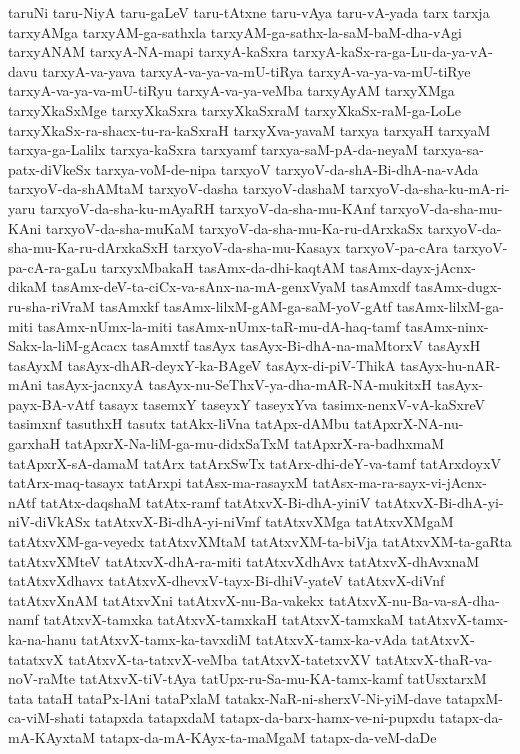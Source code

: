{taruNi
taru-NiyA
taru-gaLeV
taru-tAtxne
taru-vAya
taru-vA-yada
tarx
tarxja
tarxyAMga
tarxyAM-ga-sathxla
tarxyAM-ga-sathx-la-saM-baM-dha-vAgi
tarxyANAM
tarxyA-NA-mapi
tarxyA-kaSxra
tarxyA-kaSx-ra-ga-Lu-da-ya-vA-davu
tarxyA-va-yava
tarxyA-va-ya-va-mU-tiRya
tarxyA-va-ya-va-mU-tiRye
tarxyA-va-ya-va-mU-tiRyu
tarxyA-va-ya-veMba
tarxyAyAM
tarxyXMga
tarxyXkaSxMge
tarxyXkaSxra
tarxyXkaSxraM
tarxyXkaSx-raM-ga-LoLe
tarxyXkaSx-ra-shacx-tu-ra-kaSxraH
tarxyXva-yavaM
tarxya
tarxyaH
tarxyaM
tarxya-ga-Lalilx
tarxya-kaSxra
tarxyamf
tarxya-saM-pA-da-neyaM
tarxya-sa-patx-diVkeSx
tarxya-voM-de-nipa
tarxyoV
tarxyoV-da-shA-Bi-dhA-na-vAda
tarxyoV-da-shAMtaM
tarxyoV-dasha
tarxyoV-dashaM
tarxyoV-da-sha-ku-mA-ri-yaru
tarxyoV-da-sha-ku-mAyaRH
tarxyoV-da-sha-mu-KAnf
tarxyoV-da-sha-mu-KAni
tarxyoV-da-sha-muKaM
tarxyoV-da-sha-mu-Ka-ru-dArxkaSx
tarxyoV-da-sha-mu-Ka-ru-dArxkaSxH
tarxyoV-da-sha-mu-Kasayx
tarxyoV-pa-cAra
tarxyoV-pa-cA-ra-gaLu
tarxyxMbakaH
tasAmx-da-dhi-kaqtAM
tasAmx-dayx-jAcnx-dikaM
tasAmx-deV-ta-ciCx-va-sAnx-na-mA-genxVyaM
tasAmxdf
tasAmx-dugx-ru-sha-riVraM
tasAmxkf
tasAmx-lilxM-gAM-ga-saM-yoV-gAtf
tasAmx-lilxM-ga-miti
tasAmx-nUmx-la-miti
tasAmx-nUmx-taR-mu-dA-haq-tamf
tasAmx-ninx-Sakx-la-liM-gAcacx
tasAmxtf
tasAyx
tasAyx-Bi-dhA-na-maMtorxV
tasAyxH
tasAyxM
tasAyx-dhAR-deyxY-ka-BAgeV
tasAyx-di-piV-ThikA
tasAyx-hu-nAR-mAni
tasAyx-jacnxyA
tasAyx-nu-SeThxV-ya-dha-mAR-NA-mukitxH
tasAyx-payx-BA-vAtf
tasayx
tasemxY
taseyxY
taseyxYva
tasimx-nenxV-vA-kaSxreV
tasimxnf
tasuthxH
tasutx
tatAkx-liVna
tatApx-dAMbu
tatApxrX-NA-nu-garxhaH
tatApxrX-Na-liM-ga-mu-didxSaTxM
tatApxrX-ra-badhxmaM
tatApxrX-sA-damaM
tatArx
tatArxSwTx
tatArx-dhi-deY-va-tamf
tatArxdoyxV
tatArx-maq-tasayx
tatArxpi
tatAsx-ma-rasayxM
tatAsx-ma-ra-sayx-vi-jAcnx-nAtf
tatAtx-daqshaM
tatAtx-ramf
tatAtxvX-Bi-dhA-yiniV
tatAtxvX-Bi-dhA-yi-niV-diVkASx
tatAtxvX-Bi-dhA-yi-niVmf
tatAtxvXMga
tatAtxvXMgaM
tatAtxvXM-ga-veyedx
tatAtxvXMtaM
tatAtxvXM-ta-biVja
tatAtxvXM-ta-gaRta
tatAtxvXMteV
tatAtxvX-dhA-ra-miti
tatAtxvXdhAvx
tatAtxvX-dhAvxnaM
tatAtxvXdhavx
tatAtxvX-dhevxV-tayx-Bi-dhiV-yateV
tatAtxvX-diVnf
tatAtxvXnAM
tatAtxvXni
tatAtxvX-nu-Ba-vakekx
tatAtxvX-nu-Ba-va-sA-dha-namf
tatAtxvX-tamxka
tatAtxvX-tamxkaH
tatAtxvX-tamxkaM
tatAtxvX-tamx-ka-na-hanu
tatAtxvX-tamx-ka-tavxdiM
tatAtxvX-tamx-ka-vAda
tatAtxvX-tatatxvX
tatAtxvX-ta-tatxvX-veMba
tatAtxvX-tatetxvXV
tatAtxvX-thaR-va-noV-raMte
tatAtxvX-tiV-tAya
tatUpx-ru-Sa-mu-KA-tamx-kamf
tatUsxtarxM
tata
tataH
tataPx-lAni
tataPxlaM
tatakx-NaR-ni-sherxV-Ni-yiM-dave
tatapxM-ca-viM-shati
tatapxda
tatapxdaM
tatapx-da-barx-hamx-ve-ni-pupxdu
tatapx-da-mA-KAyxtaM
tatapx-da-mA-KAyx-ta-maMgaM
tatapx-da-veM-daDe
}
